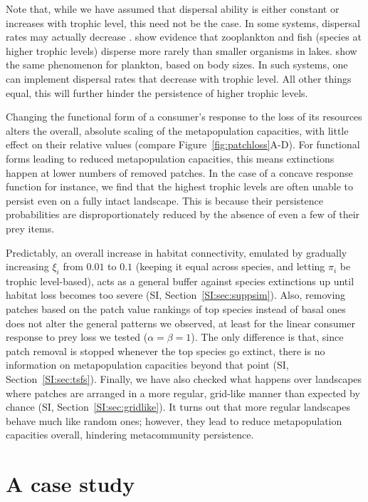 \documentclass[11pt]{article}
\newcommand{\SI}{SI}
\begin{document}
Note that, while we have assumed that dispersal ability is either constant or increases with trophic level, this need not be the case. In some systems, dispersal rates may actually decrease \citep{Pedersenetal2016}. \citet{Beisneretal2006} show evidence that zooplankton and fish (species at higher trophic levels) disperse more rarely than smaller organisms in lakes. \citet{Villarinoetal2018} show the same phenomenon for plankton, based on body sizes. In such systems, one can implement dispersal rates that decrease with trophic level. All other things equal, this will further hinder the persistence of higher trophic levels.

Changing the functional form of a consumer's response to the loss of its resources alters the overall, absolute scaling of the metapopulation capacities, with little effect on their relative values (compare Figure~\ref{fig:patchloss}A-D). For functional forms leading to reduced metapopulation capacities, this means extinctions happen at lower numbers of removed patches. In the case of a concave response function for instance, we find that the highest trophic levels are often unable to persist even on a fully intact landscape. This is because their persistence probabilities are disproportionately reduced by the absence of even a few of their prey items.

Predictably, an overall increase in habitat connectivity, emulated by gradually increasing $\xi_i$ from $0.01$ to $0.1$ (keeping it equal across species, and letting $\pi_i$ be trophic level-based), acts as a general buffer against species extinctions up until habitat loss becomes too severe (\SI, Section~\ref{SI:sec:suppsim}). Also, removing patches based on the patch value rankings of top species instead of basal ones does not alter the general patterns we observed, at least for the linear consumer response to prey loss we tested ($\alpha = \beta = 1$). The only difference is that, since patch removal is stopped whenever the top species go extinct, there is no information on metapopulation capacities beyond that point (\SI, Section~\ref{SI:sec:tsfs}). Finally, we have also checked what happens over landscapes where patches are arranged in a more regular, grid-like manner than expected by chance (\SI, Section~\ref{SI:sec:gridlike}). It turns out that more regular landscapes behave much like random ones; however, they lead to reduce metapopulation capacities overall, hindering metacommunity persistence.


\section{A case study} \label{sec:empirical}
\end{document}
